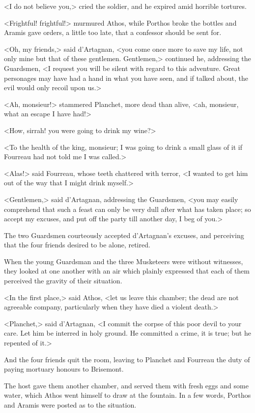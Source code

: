 <I do not believe you,> cried the soldier, and he expired amid horrible tortures. 

<Frightful! frightful!> murmured Athos, while Porthos broke the bottles and Aramis gave orders, a little too late, that a confessor should be sent for. 

<Oh, my friends,> said d'Artagnan, <you come once more to save my life, not only mine but that of these gentlemen. Gentlemen,> continued he, addressing the Guardsmen, <I request you will be silent with regard to this adventure. Great personages may have had a hand in what you have seen, and if talked about, the evil would only recoil upon us.> 

<Ah, monsieur!> stammered Planchet, more dead than alive, <ah, monsieur, what an escape I have had!> 

<How, sirrah! you were going to drink my wine?> 

<To the health of the king, monsieur; I was going to drink a small glass of it if Fourreau had not told me I was called.> 

<Alas!> said Fourreau, whose teeth chattered with terror, <I wanted to get him out of the way that I might drink myself.> 

<Gentlemen,> said d'Artagnan, addressing the Guardsmen, <you may easily comprehend that such a feast can only be very dull after what has taken place; so accept my excuses, and put off the party till another day, I beg of you.> 

The two Guardsmen courteously accepted d'Artagnan's excuses, and perceiving that the four friends desired to be alone, retired. 

When the young Guardsman and the three Musketeers were without witnesses, they looked at one another with an air which plainly expressed that each of them perceived the gravity of their situation. 

<In the first place,> said Athos, <let us leave this chamber; the dead are not agreeable company, particularly when they have died a violent death.> 

<Planchet,> said d'Artagnan, <I commit the corpse of this poor devil to your care. Let him be interred in holy ground. He committed a crime, it is true; but he repented of it.> 

And the four friends quit the room, leaving to Planchet and Fourreau the duty of paying mortuary honours to Brisemont. 

The host gave them another chamber, and served them with fresh eggs and some water, which Athos went himself to draw at the fountain. In a few words, Porthos and Aramis were posted as to the situation. 

